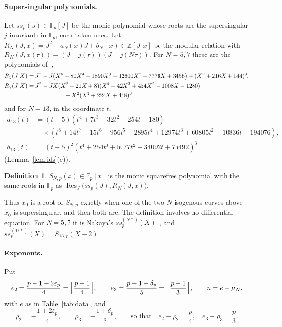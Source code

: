 \documentclass[11pt,a4paper]{article}
\theoremstyle{definition}
\newtheorem{definition}[theorem]{Definition}
\theoremstyle{remark}
\newcommand{\F}{\mathbb{F}}
\newcommand{\Z}{\mathbb{Z}}
\newcommand{\Fpbar}{\overline{\F}_p}
\newcommand{\Res}{\operatorname{Res}}
\newcommand{\ssp}{\mathit{ss}_p}
\numberwithin{equation}{section}
\begin{document}
\paragraph{Supersingular polynomials.}
Let $\ssp(J)\in\F_p[J]$ be the monic polynomial whose roots are the
supersingular $j$-invariants in $\Fpbar$, each taken once. Let
$R_N(J,x)=J^2-a_N(x)J+b_N(x)\in\Z[J,x]$ be the modular relation with
$R_N(J,x(\tau))=(J-j(\tau))(J-j(N\tau))$. For $N=5,7$ these are the
polynomials of~\cite[Example~1]{Nakaya19},
\begin{align*}
R_5(J,X)&=J^2-J\bigl(X^5-80X^4+1890X^3-12600X^2+7776X+3456\bigr)
              +(X^2+216X+144)^3,\\
R_7(J,X)&=J^2-JX(X^2-21X+8)(X^4-42X^3+454X^2-1008X-1280)\\
&\hspace{22mm}+X^2(X^2+224X+448)^3,
\end{align*}
and for $N=13$, in the coordinate $t$,
\begin{align*}
a_{13}(t)&=(t+5)(t^4+7t^3-32t^2-254t-180)\\
&\quad\times(t^8+14t^7-15t^6-956t^5-2895t^4+12974t^3+60805t^2-10836t-194076),\\
b_{13}(t)&=(t+5)^2(t^4+254t^3+5077t^2+34092t+75492)^3
\end{align*}
(Lemma~\ref{lem:ids}(e)).

\begin{definition}\label{def:S}
$S_{N,p}(x)\in\F_p[x]$ is the monic squarefree polynomial with the same roots
in $\Fpbar$ as $\Res_J\bigl(\ssp(J),R_N(J,x)\bigr)$.
\end{definition}

Thus $x_0$ is a root of $S_{N,p}$ exactly when one of the two $N$-isogenous
curves above $x_0$ is supersingular, and then both are. The definition involves no
differential equation. For $N=5,7$ it is Nakaya's
$\ssp^{(N*)}(X)$~\cite[eq.~(20)]{Nakaya19}, and
$\ssp^{(13*)}(X)=S_{13,p}(X-2)$.

\paragraph{Exponents.} Put
\begin{equation}\label{eq:exps}
e_2=\frac{p-1-2\varepsilon_p}{4}=\Bigl\lfloor\frac{p-1}4\Bigr\rfloor,\qquad
e_3=\frac{p-1-\delta_p}{3}=\Bigl\lfloor\frac{p-1}3\Bigr\rfloor,\qquad
n=e-\mu_N,
\end{equation}
with $e$ as in Table~\ref{tab:data}, and
\begin{equation}\label{eq:rhos}
\rho_2=-\frac{1+2\varepsilon_p}{4},\qquad\rho_3=-\frac{1+\delta_p}{3},
\qquad\text{so that}\quad e_2-\rho_2=\frac p4,\quad e_3-\rho_3=\frac p3 .
\end{equation}
\end{document}
